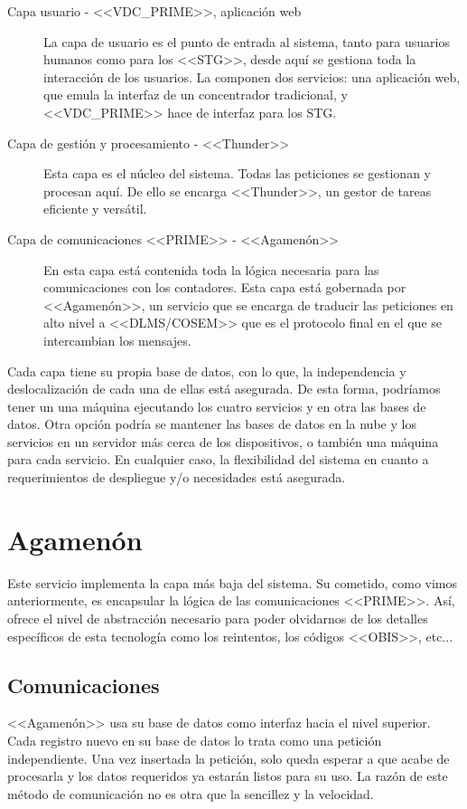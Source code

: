 \begin{description}
	\item[Capa usuario - <<VDC\_PRIME>>, aplicación web] La capa de usuario es el punto de entrada al sistema, tanto para usuarios humanos como para los <<STG>>, desde aquí se gestiona toda la interacción de los usuarios. La componen dos servicios: una aplicación web, que emula la interfaz de un concentrador tradicional, y <<VDC\_PRIME>> hace de interfaz para los STG. 
	\item[Capa de gestión y procesamiento - <<Thunder>>] Esta capa es el núcleo del sistema. Todas las peticiones se gestionan y procesan aquí. De ello se encarga <<Thunder>>, un gestor de tareas eficiente y versátil.
	\item[Capa de comunicaciones <<PRIME>> - <<Agamenón>>] En esta capa está contenida toda la lógica necesaria para las comunicaciones con los contadores. Esta capa está gobernada por <<Agamenón>>, un servicio que se encarga de traducir las peticiones en alto nivel a <<DLMS/COSEM>> que es el protocolo final en el que se intercambian los mensajes.
\end{description}

Cada capa tiene su propia base de datos, con lo que, la independencia y deslocalización de cada una de ellas está asegurada. De esta forma, podríamos tener un una máquina ejecutando los cuatro servicios y en otra las bases de datos. Otra opción podría se mantener las bases de datos en la nube y los servicios en un servidor más cerca de los dispositivos, o también una máquina para cada servicio. En cualquier caso, la flexibilidad del sistema en cuanto a requerimientos de despliegue y/o necesidades está asegurada.

\section{Agamenón}

Este servicio implementa la capa más baja del sistema. Su cometido, como vimos anteriormente, es encapsular la lógica de las comunicaciones <<PRIME>>. Así, ofrece el nivel de abstracción necesario para poder olvidarnos de los detalles específicos de esta tecnología como los reintentos, los códigos <<OBIS>>, etc...
\subsection{Comunicaciones}
<<Agamenón>> usa su base de datos como interfaz hacia el nivel superior. Cada registro nuevo en su base de datos lo trata como una petición independiente. Una vez insertada la petición, solo queda esperar a que acabe de procesarla y los datos requeridos ya estarán listos para su uso. La razón de este método de comunicación no es otra que la sencillez y la velocidad. 

